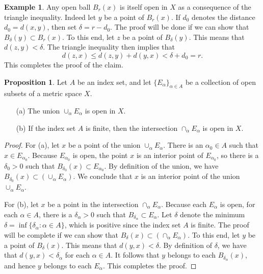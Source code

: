 \documentclass[12pt]{article}
\theoremstyle{definition}
\newtheorem{example}[definition]{Example}
\theoremstyle{theorem}
\newtheorem{proposition}[definition]{Proposition}
\begin{document}
\begin{example}
Any open ball $B_r(x)$ is itself open in $X$ as a consequence of the triangle inequality. Indeed let $y$ be a point of $B_r(x)$. If $d_0$ denotes the distance $d_0 = d(x,y)$, then set $\delta = r - d_0$. The proof will be done if we can show that $B_\delta(y) \subset B_r(x)$. To this end, let $z$ be a point of $B_\delta(y)$. This means that $d(z,y) < \delta$. The triangle inequality then implies that 
\[
d(z,x) \leqslant d(z,y) + d(y,x) < \delta + d_0 = r.
\]
This completes the proof of the claim. 
\end{example}

\begin{proposition}\label{prop:openunion}
Let $A$ be an index set, and let $\{E_\alpha\}_{\alpha \in A}$ be a collection of open subsets of a metric space $X$. 
\begin{enumerate}
\item[(a)] The union $\cup_\alpha E_\alpha$ is open in $X$. 
\item[(b)] If the index set $A$ is finite, then the intersection $\cap_\alpha E_\alpha$ is open in $X$. 
\end{enumerate}
\end{proposition}

\begin{proof}
For (a), let $x$ be a point of the union $\cup_\alpha E_\alpha$. There is an $\alpha_0 \in A$ such that $x \in E_{\alpha_0}$. Because $E_{\alpha_0}$ is open, the point $x$ is an interior point of $E_{\alpha_0}$, so there is a $\delta_0 > 0$ such that $B_{\delta_0}(x) \subset E_{\alpha_0}$. By definition of the union, we have $B_{\delta_0}(x) \subset \left(\cup_\alpha E_\alpha\right)$. We conclude that $x$ is an interior point of the union $\cup_\alpha E_\alpha$. 

For (b), let $x$ be a point in the intersection $\cap_\alpha E_\alpha$. Because each $E_\alpha$ is open, for each $\alpha \in A$, there is a $\delta_\alpha > 0$ such that $B_{\delta_\alpha} \subset E_\alpha$. Let $\delta$ denote the minimum $\delta = \inf\{\delta_\alpha : \alpha \in A\}$, which is positive since the index set $A$ is finite. The proof will be complete if we can show that $B_\delta(x) \subset \left(\cap_\alpha E_\alpha \right)$. To this end, let $y$ be a point of $B_\delta(x)$. This means that $d(y,x) < \delta$. By definition of $\delta$, we have that $d(y,x) < \delta_\alpha$ for each $\alpha \in A$. It follows that $y$ belongs to each $B_{\delta_\alpha}(x)$, and hence $y$ belongs to each $E_\alpha$. This completes the proof. 
\end{proof}
\end{document}
